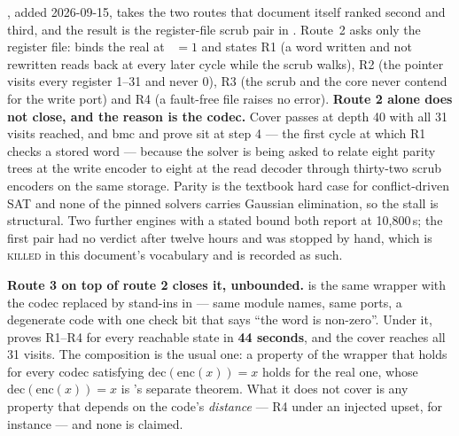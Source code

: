 , added 2026-09-15, takes the two routes that
document itself ranked second and third, and the result is the
register-file scrub pair in . Route~2 asks only the
register file:  binds the real
 at ~$=1$ and states R1 (a word
written and not rewritten reads back at every later cycle while the scrub
walks), R2 (the pointer visits every register 1--31 and never 0), R3 (the
scrub and the core never contend for the write port) and R4 (a fault-free
file raises no error). \textbf{Route 2 alone does not close, and the
reason is the codec.} Cover passes at depth 40 with all 31 visits
reached, and bmc and prove sit at step 4 --- the first cycle at which R1
checks a stored word --- because the solver is being asked to relate
eight parity trees at the write encoder to eight at the read decoder
through thirty-two scrub encoders on the same storage. Parity is the
textbook hard case for conflict-driven SAT and none of the pinned solvers
carries Gaussian elimination, so the stall is structural. Two further
engines with a stated bound both report  at 10,800\,s; the
first pair had no verdict after twelve hours and was stopped by hand,
which is \textsc{killed} in this document's vocabulary and is recorded as
such.

\textbf{Route 3 on top of route 2 closes it, unbounded.}
 is the same wrapper with the codec
replaced by stand-ins in  --- same
module names, same ports, a degenerate code with one check bit that says
``the word is non-zero''. Under it,  proves R1--R4 for
every reachable state in \textbf{44 seconds}, and the cover reaches all
31 visits. The composition is the usual one: a property of the wrapper
that holds for every codec satisfying $\mathrm{dec}(\mathrm{enc}(x)) = x$
holds for the real one, whose $\mathrm{dec}(\mathrm{enc}(x)) = x$ is
's separate theorem. What it does not cover is
any property that depends on the code's \emph{distance} --- R4 under an
injected upset, for instance --- and none is claimed.

